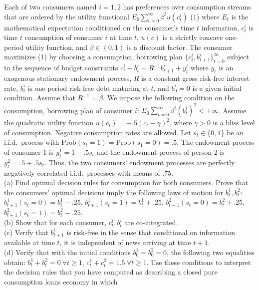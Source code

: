 \documentclass[12pt, letterpaper]{article}
\begin{document}
\begin{tcolorbox}[oddbox,title={Exercise 2.27 \quad Permanent Income Model Again}]
\begin{tcolorbox}[questionbox]
Each of two consumers named $i=1,2$ has preferences over consumption streams that are ordered by the
utility functional $E_0\sum_{t=0}^\infty\beta^tu(c^i_t)$ (1) where $E_t$ is the mathematical
expectation conditioned on the consumer's time $t$ information, $c^i_t$ is time $t$ consumption of
consumer $i$ at time $t$, $u(c)$ is a strictly concave one-period utility function, and
$\beta\in(0,1)$ is a discount factor. The consumer maximizes (1) by choosing a consumption, borrowing
plan $\{c^i_t,b^i_{t+1}\}_{t=0}^\infty$ subject to the sequence of budget constraints
$c^i_t+b^i_t=R^{-1}b^i_{t+1}+y^i_t$ where $y_t$ is an exogenous stationary endowment process, $R$ is a
constant gross risk-free interest rate, $b^i_t$ is one-period risk-free debt maturing at $t$, and
$b^i_0=0$ is a given initial condition. Assume that $R^{-1}=\beta$. We impose the following condition
on the consumption, borrowing plan of consumer $i$: $E_0\sum_{t=0}^\infty\beta^t(b^i_t)^2<+\infty$.
Assume the quadratic utility function $u(c_t)=-.5(c_t-\gamma)^2$, where $\gamma>0$ is a bliss level of
consumption. Negative consumption rates are allowed. Let $s_t\in\{0,1\}$ be an i.i.d.\ process with
$\text{Prob}(s_t=1)=\text{Prob}(s_1=0)=.5$. The endowment process of consumer 1 is $y^1_t=1-.5s_t$ and
the endowment process of person 2 is $y^2_t=.5+.5s_t$. Thus, the two consumers' endowment processes are
perfectly negatively correlated i.i.d.\ processes with means of .75.\\[3pt]
(a) Find optimal decision rules for consumption for both consumers. Prove that the consumers' optimal
decisions imply the following laws of motion for $b^1_t,b^2_t$:
$b^1_{t+1}(s_t=0)=b^1_t-.25$, $b^1_{t+1}(s_t=1)=b^1_t+.25$, $b^2_{t+1}(s_t=0)=b^2_t+.25$,
$b^2_{t+1}(s_t=1)=b^2_t-.25$.\\
(b) Show that for each consumer, $c^i_t,b^i_t$ are co-integrated.\\
(c) Verify that $b^i_{t+1}$ is risk-free in the sense that conditional on information available at
time $t$, it is independent of news arriving at time $t+1$.\\
(d) Verify that with the initial conditions $b^1_0=b^2_0=0$, the following two equalities obtain:
$b^1_t+b^2_t=0\ \forall t\ge1$, $c^1_t+c^2_t=1.5\ \forall t\ge1$. Use these conditions to interpret the
decision rules that you have computed as describing a closed pure consumption loans economy in which

\end{tcolorbox}
\end{tcolorbox}
\end{document}
